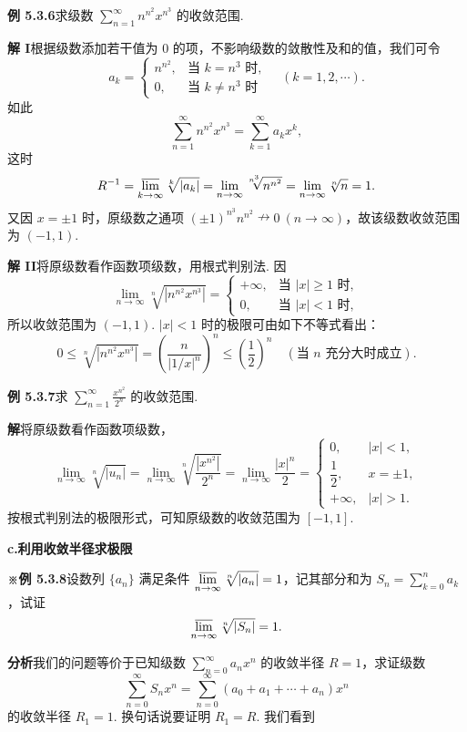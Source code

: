 \documentclass[UTF8,12pt,a4paper,fontset=fandol]{ctexart}
\begin{document}
\noindent\textbf{例 5.3.6}\quad 求级数 $\displaystyle\sum_{n=1}^{\infty}n^{n^2}x^{n^3}$ 的收敛范围.

\noindent\textbf{解 I}\quad 根据级数添加若干值为 0 的项，不影响级数的敛散性及和的值，我们可令
\[
  a_k=
  \begin{cases}
    n^{n^2},&\text{当 }k=n^3\text{ 时},\\
    0,&\text{当 }k\ne n^3\text{ 时}
  \end{cases}
  \quad(k=1,2,\cdots).
\]
如此
\[
  \sum_{n=1}^{\infty}n^{n^2}x^{n^3}
  =\sum_{k=1}^{\infty}a_kx^k,
\]
这时
\[
  R^{-1}=\varlimsup_{k\to\infty}\sqrt[k]{|a_k|}
  =\lim_{n\to\infty}\sqrt[n^3]{n^{n^2}}
  =\lim_{n\to\infty}\sqrt[n]{n}=1.
\]
又因 $x=\pm1$ 时，原级数之通项 $(\pm1)^{n^3}n^{n^2}\nrightarrow0\ (n\to\infty)$，故该级数收敛范围为
$(-1,1)$.

\noindent\textbf{解 II}\quad 将原级数看作函数项级数，用根式判别法. 因
\[
  \lim_{n\to\infty}\sqrt[n]{|n^{n^2}x^{n^3}|}=
  \begin{cases}
    +\infty,&\text{当 }|x|\ge1\text{ 时},\\
    0,&\text{当 }|x|<1\text{ 时},
  \end{cases}
\]
所以收敛范围为 $(-1,1)$. $|x|<1$ 时的极限可由如下不等式看出：
\[
  0\le\sqrt[n]{|n^{n^2}x^{n^3}|}
  =\left(\frac{n}{|1/x|^n}\right)^n
  \le\left(\frac12\right)^n\quad(\text{当 }n\text{ 充分大时成立}).
\]

\noindent\textbf{例 5.3.7}\quad 求 $\displaystyle\sum_{n=1}^{\infty}\frac{x^{n^2}}{2^n}$ 的收敛范围.

\noindent\textbf{解}\quad 将原级数看作函数项级数，
\[
  \lim_{n\to\infty}\sqrt[n]{|u_n|}
  =\lim_{n\to\infty}\sqrt[n]{\frac{|x^{n^2}|}{2^n}}
  =\lim_{n\to\infty}\frac{|x|^n}{2}
  =
  \begin{cases}
    0,&|x|<1,\\
    \dfrac12,&x=\pm1,\\
    +\infty,&|x|>1.
  \end{cases}
\]
按根式判别法的极限形式，可知原级数的收敛范围为 $[-1,1]$.

\noindent\textbf{c.\quad 利用收敛半径求极限}

\noindent\textbf{※例 5.3.8}\quad 设数列 $\{a_n\}$ 满足条件
$\displaystyle\varlimsup_{n\to\infty}\sqrt[n]{|a_n|}=1$，记其部分和为
$S_n=\displaystyle\sum_{k=0}^n a_k$，试证
\[
  \varlimsup_{n\to\infty}\sqrt[n]{|S_n|}=1.
\]

\noindent\textbf{分析}\quad 我们的问题等价于已知级数 $\displaystyle\sum_{n=0}^{\infty}a_nx^n$ 的收敛半径
$R=1$，求证级数
\[
  \sum_{n=0}^{\infty}S_nx^n
  =\sum_{n=0}^{\infty}(a_0+a_1+\cdots+a_n)x^n
\]
的收敛半径 $R_1=1$. 换句话说要证明 $R_1=R$. 我们看到
\end{document}
